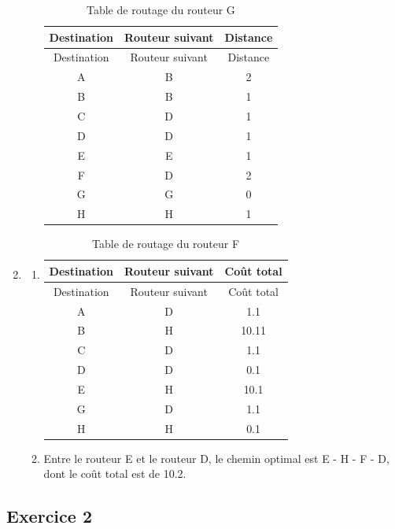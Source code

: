 \documentclass[
  letterpaper,
  DIV=11,
  numbers=noendperiod]{scrartcl}
\begin{document}
\begin{enumerate}
\begin{enumerate}
    \begin{longtable}[]{@{}ccc@{}}
    \caption{Table de routage du routeur G}\tabularnewline
    \toprule\noalign{}
    Destination & Routeur suivant & Distance \\
    \midrule\noalign{}
    \endfirsthead
    \toprule\noalign{}
    Destination & Routeur suivant & Distance \\
    \midrule\noalign{}
    \endhead
    \bottomrule\noalign{}
    \endlastfoot
    A & B & 2 \\
    B & B & 1 \\
    C & D & 1 \\
    D & D & 1 \\
    E & E & 1 \\
    F & D & 2 \\
    G & G & 0 \\
    H & H & 1 \\
    \end{longtable}
  \end{enumerate}
\item
  \begin{enumerate}
  \def\labelenumii{\alph{enumii}.}
  \item
    \begin{longtable}[]{@{}ccc@{}}
    \caption{Table de routage du routeur F}\tabularnewline
    \toprule\noalign{}
    Destination & Routeur suivant & Coût total \\
    \midrule\noalign{}
    \endfirsthead
    \toprule\noalign{}
    Destination & Routeur suivant & Coût total \\
    \midrule\noalign{}
    \endhead
    \bottomrule\noalign{}
    \endlastfoot
    A & D & 1.1 \\
    B & H & 10.11 \\
    C & D & 1.1 \\
    D & D & 0.1 \\
    E & H & 10.1 \\
    G & D & 1.1 \\
    H & H & 0.1 \\
    \end{longtable}
  \item
    Entre le routeur E et le routeur D, le chemin optimal est E - H - F
    - D, dont le coût total est de 10.2.
  \end{enumerate}
\end{enumerate}

\hypertarget{exercice-2}{%
\subsection{Exercice 2}\label{exercice-2}}
\end{document}
